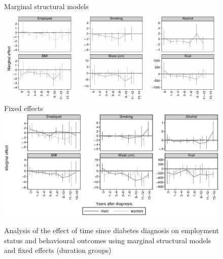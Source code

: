 \begin{figure}
\begin{center}
\caption{\label{fig:duration_g_fe_mi} Analysis of the effect of time since diabetes diagnosis on employment status and behavioural outcomes using marginal structural models and fixed effects (duration groups)}
Marginal structural models
\includegraphics[width=\linewidth]{Chapter5/Figures/mi_msm_l_all}
Fixed effects
\includegraphics[width=\linewidth]{Chapter5/Figures/mi_fe}

\end{center}
\end{figure}


